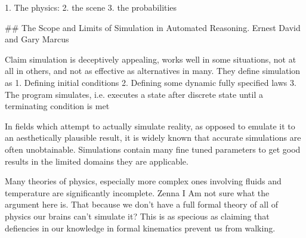 \documentclass{tlp}
\begin{document}
1. The physics:
2. the scene
3. the probabilities

## The Scope and Limits of Simulation in Automated Reasoning. Ernest David and Gary Marcus

Claim simulation is deceptively appealing, works well in some situations, not at all in others, and not as effective as alternatives in many.
They define simulation as
1. Defining initial conditions
2. Defining some dynamic fully specified laws
3. The program simulates, i.e. executes a state after discrete state until a terminating condition is met

In fields which attempt to actually simulate reality, as opposed to emulate it to an aesthetically plausible result, it is widely known that accurate simulations are often unobtainable.
Simulations contain many fine tuned parameters to get good results in the limited domains they are applicable.

Many theories of physics, especially more complex ones involving fluids and temperature are significantly incomplete.
Zenna I Am not sure what the argument here is. That because we don't have a full formal theory of all of physics our brains can't simulate it? This is as specious as claiming that defiencies in our knowledge in formal kinematics prevent us from walking.
\end{document}

